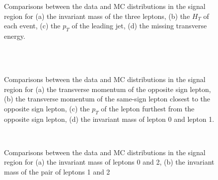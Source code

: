 
\begin{figure}[H]
    \\
    \\
    \caption{Comparisons between the data and MC distributions in the signal region for (a) the invariant mass of the three leptons, (b) the $H_T$ of each event, (c) the $p_T$ of the leading jet, (d) the missing transverse energy.}    
\end{figure}
\begin{figure}[H]
    \\
    \\
    \caption{Comparisons between the data and MC distributions in the signal region for (a) the transverse momentum of the opposite sign lepton, (b) the transverse momentum of the same-sign lepton closest to the opposite sign lepton, (c) the $p_T$ of the lepton furthest from the opposite sign lepton, (d) the invariant mass of lepton 0 and lepton 1.}
\end{figure}
\begin{figure}[H]
    \\
    \caption{Comparisons between the data and MC distributions in the signal region for (a) the invariant mass of leptons 0 and 2, (b) the invariant mass of the pair of leptons 1 and 2}
    \label{sr_kinematics}
\end{figure}


